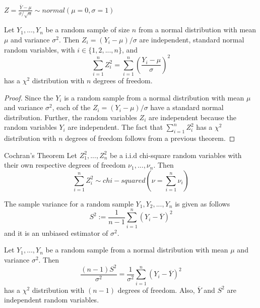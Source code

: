 \documentclass[12pt, a4paper, twoside, openright, titlepage]{book}
\begin{document}
\begin{cor}{}{}
    $Z = \frac{\overline{Y}-\mu}{\sigma/\sqrt{n}} \sim normal(\mu = 0, \sigma = 1)$
\end{cor}



\begin{thm}{}{}
    Let $Y_1,...,Y_n$ be a random sample of size $n$ from a normal distribution with mean $\mu$ and variance $\sigma^2$. Then $Z_i = (Y_i-\mu)/\sigma$ are independent, standard normal random variables, with $i \in \{1,2,...,n\}$, and \begin{equation*}
        \sum\limits_{i=1}^nZ_i^2 = \sum\limits_{i=1}^n\left(\frac{Y_i-\mu}{\sigma}\right)^2
    \end{equation*}
    has a $\chi^2$ distribution with $n$ degrees of freedom.
\end{thm}
\begin{proof}{}{}
    Since the $Y_i$ is a random sample from a normal distribution with mean $\mu$ and variance $\sigma^2$, each of the $Z_i = (Y_i-\mu)/\sigma$ have a standard normal distribution. Further, the random variables $Z_i$ are independent because the random variables $Y_i$ are independent. The fact that $\sum_{i=1}^nZ_i^2$ has a $\chi^2$ distribution with $n$ degrees of freedom follows from a previous theorem.
\end{proof}


\begin{thm}{Cochran's Theorem}{}
    Let $Z_1^2,...,Z_n^2$ be a i.i.d chi-square random variables with their own respective degrees of freedom $\nu_1,...,\nu_n$. Then \begin{equation*}
        \sum_{i=1}^nZ_i^2 \sim chi-squared(\nu = \sum_{i=1}^n\nu_i)
    \end{equation*}
\end{thm}



\begin{defn}{}{}
    The sample variance for a random sample $Y_1,Y_2,...,Y_n$ is given as follows \begin{equation*}
        S^2 := \frac{1}{n-1}\sum\limits_{i=1}^n(Y_i-\overline{Y})^2
    \end{equation*}
    and it is an unbiased estimator of $\sigma^2$.
\end{defn}

\begin{thm}{}{}
    Let $Y_1,...,Y_n$ be a random sample from a normal distribution with mean $\mu$ and variance $\sigma^2$. Then \begin{equation*}
        \frac{(n-1)S^2}{\sigma^2} = \frac{1}{\sigma^2}\sum\limits_{i=1}^n(Y_i-\overline{Y})^2
    \end{equation*}
    has a $\chi^2$ distribution with $(n-1)$ degrees of freedom. Also, $\overline{Y}$ and $S^2$ are independent random variables.
\end{thm}
\end{document}
